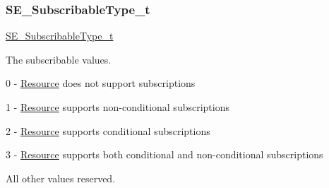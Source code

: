 \subsubsection{\texorpdfstring{S\+E\+\_\+\+Subscribable\+Type\+\_\+t}{SE\_SubscribableType\_t}}
{\footnotesize\ttfamily \hyperlink{group__SubscribableType_ga5c41f553d369710ed34619266bf2551e}{S\+E\+\_\+\+Subscribable\+Type\+\_\+t}}

The subscribable values.

0 -\/ \hyperlink{structResource}{Resource} does not support subscriptions

1 -\/ \hyperlink{structResource}{Resource} supports non-\/conditional subscriptions

2 -\/ \hyperlink{structResource}{Resource} supports conditional subscriptions

3 -\/ \hyperlink{structResource}{Resource} supports both conditional and non-\/conditional subscriptions

All other values reserved. 